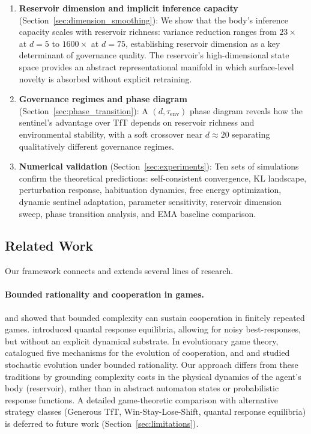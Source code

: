 \documentclass[11pt,a4paper]{article}
\theoremstyle{definition}
\begin{document}
\begin{enumerate}[label=(\roman*)]
  \item \textbf{Reservoir dimension and implicit inference capacity}
    (Section~\ref{sec:dimension_smoothing}):
    We show that the body's inference capacity scales with reservoir
    richness: variance reduction ranges from $23\times$ at $d = 5$ to $1600\times$
    at $d = 75$, establishing reservoir dimension as a key determinant of
    governance quality.  The reservoir's high-dimensional state space provides an
    abstract representational manifold in which surface-level novelty is absorbed
    without explicit retraining.

  \item \textbf{Governance regimes and phase diagram}
    (Section~\ref{sec:phase_transition}):
    A $(d, \tau_{\mathrm{env}})$ phase diagram reveals how the sentinel's
    advantage over TfT depends on reservoir richness and environmental
    stability, with a soft crossover near $d \approx 20$ separating
    qualitatively different governance regimes.

  \item \textbf{Numerical validation} (Section~\ref{sec:experiments}):
    Ten sets of simulations confirm the theoretical predictions: self-consistent
    convergence, KL landscape, perturbation response, habituation dynamics,
    free energy optimization, dynamic sentinel adaptation, parameter sensitivity,
    reservoir dimension sweep, phase transition analysis, and EMA baseline
    comparison.
\end{enumerate}

\subsection{Related Work}

Our framework connects and extends several lines of research.

\paragraph{Bounded rationality and cooperation in games.}
\citet{rubinstein1986} and \citet{neyman1985} showed that bounded complexity
can sustain cooperation in finitely repeated games.  \citet{mckelvey1995}
introduced quantal response equilibria, allowing for noisy best-responses, but
without an explicit dynamical substrate.  In evolutionary game theory,
\citet{nowak2006} catalogued five mechanisms for the evolution of cooperation,
and \citet{kandori1993} and \citet{young1993} studied stochastic evolution
under bounded rationality.  Our approach differs from these traditions by
grounding complexity costs in the physical dynamics of the agent's body
(reservoir), rather than in abstract automaton states or probabilistic
response functions.  A detailed game-theoretic comparison with alternative
strategy classes (Generous TfT, Win-Stay-Lose-Shift, quantal response
equilibria) is deferred to future work (Section~\ref{sec:limitations}).
\end{document}
